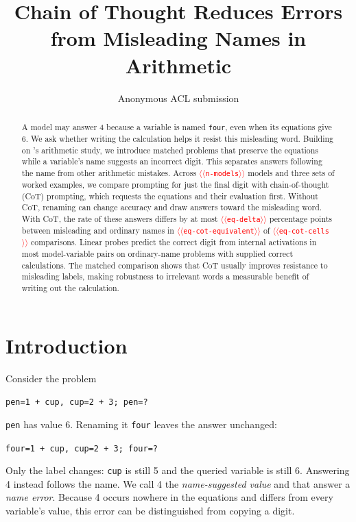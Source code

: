\documentclass[11pt]{article}
\title{Chain of Thought Reduces Errors from Misleading Names in Arithmetic}
\author{Anonymous ACL submission}
\providecommand{\NUM}[1]{\textcolor{red}{$\langle\langle$\texttt{#1}$\rangle\rangle$}}
\begin{document}
\maketitle

\begin{abstract}
A model may answer 4 because a variable is named \texttt{four}, even when its equations
give 6. We ask whether writing the calculation helps it resist this misleading word.
Building on \citeauthor{kudo2026faithful}'s arithmetic study, we introduce matched problems
that preserve the equations while a variable's name suggests an incorrect digit.
This separates answers following the name from other arithmetic mistakes. Across
\NUM{n-models} models and three sets of worked examples, we compare prompting for just
the final digit with chain-of-thought (CoT) prompting, which requests the equations and
their evaluation first. Without CoT, renaming can change accuracy and draw answers toward
the misleading word. With CoT, the rate of these answers differs by at most
\NUM{eq-delta} percentage points between misleading and ordinary names in
\NUM{eq-cot-equivalent} of \NUM{eq-cot-cells} comparisons. Linear probes predict the
correct digit from internal activations in most model-variable pairs on ordinary-name
problems with supplied correct calculations. The matched comparison shows that CoT
usually improves resistance to misleading labels, making robustness to irrelevant words
a measurable benefit of writing out the calculation.
\end{abstract}

\section{Introduction}

Consider the problem
\begin{center}
\texttt{pen=1 + cup, \quad cup=2 + 3; \quad pen=?}
\end{center}
\texttt{pen} has value 6. Renaming it \texttt{four} leaves the answer unchanged:
\begin{center}
\texttt{\textcolor{inc}{four}=1 + cup, \quad cup=2 + 3; \quad \textcolor{inc}{four}=?}
\end{center}
Only the label changes: \texttt{cup} is still 5 and the queried variable is still 6.
Answering 4 instead follows the name. We call 4 the \emph{name-suggested value} and that
answer a \emph{name error}. Because 4 occurs nowhere in the equations and differs from
every variable's value, this error can be distinguished from copying a digit.
\end{document}
